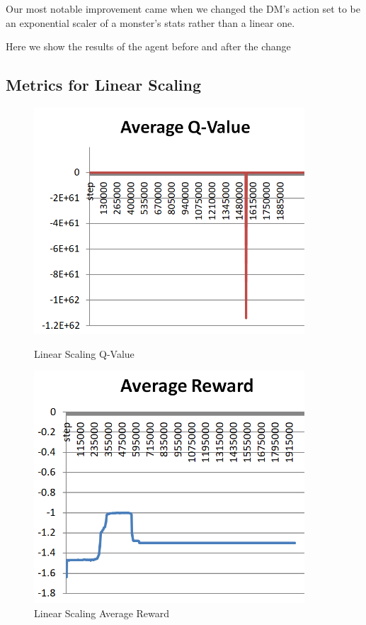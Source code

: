 \documentclass{article}
\begin{document}
Our most notable improvement came when we changed the DM's action set to be an exponential scaler of a monster's stats rather than a linear one. 

Here we show the results of the agent before and after the change

\subsection{Metrics for Linear Scaling}
\begin{figure}[h]
	\begin{minipage}{0.5 \textwidth}
		\centering
		\includegraphics[width=0.9\textwidth]{AverageQBad.png}
		\caption{Linear Scaling Q-Value}
	\end{minipage}
	\begin{minipage}{0.5 \textwidth}
		\centering
		\includegraphics[width=0.9\textwidth]{AverageRewardBad.png}
		\caption{Linear Scaling Average Reward}
	\end{minipage}
\end{figure}
\end{document}
